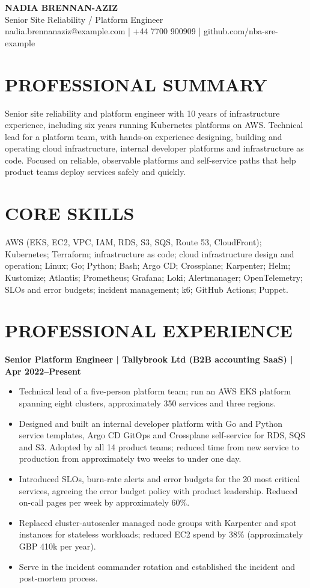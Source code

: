 \documentclass[11pt,a4paper]{article}
\begin{document}
\begin{center}
{\Huge\bfseries\color{primarycolor} NADIA BRENNAN-AZIZ}\\[0.3em]
{\large\color{accentcolor} Senior Site Reliability / Platform Engineer}\\[0.35em]
 nadia.brennanaziz@example.com | +44 7700 900909 | github.com/nba-sre-example
\end{center}

\section*{PROFESSIONAL SUMMARY}
Senior site reliability and platform engineer with 10 years of infrastructure experience, including six years running Kubernetes platforms on AWS. Technical lead for a platform team, with hands-on experience designing, building and operating cloud infrastructure, internal developer platforms and infrastructure as code. Focused on reliable, observable platforms and self-service paths that help product teams deploy services safely and quickly.

\section*{CORE SKILLS}
AWS (EKS, EC2, VPC, IAM, RDS, S3, SQS, Route 53, CloudFront); Kubernetes; Terraform; infrastructure as code; cloud infrastructure design and operation; Linux; Go; Python; Bash; Argo CD; Crossplane; Karpenter; Helm; Kustomize; Atlantis; Prometheus; Grafana; Loki; Alertmanager; OpenTelemetry; SLOs and error budgets; incident management; k6; GitHub Actions; Puppet.

\section*{PROFESSIONAL EXPERIENCE}
\noindent\textbf{Senior Platform Engineer | Tallybrook Ltd (B2B accounting SaaS) | Apr 2022--Present}
\begin{itemize}
\item Technical lead of a five-person platform team; run an AWS EKS platform spanning eight clusters, approximately 350 services and three regions.
\item Designed and built an internal developer platform with Go and Python service templates, Argo CD GitOps and Crossplane self-service for RDS, SQS and S3. Adopted by all 14 product teams; reduced time from new service to production from approximately two weeks to under one day.
\item Introduced SLOs, burn-rate alerts and error budgets for the 20 most critical services, agreeing the error budget policy with product leadership. Reduced on-call pages per week by approximately 60\%.
\item Replaced cluster-autoscaler managed node groups with Karpenter and spot instances for stateless workloads; reduced EC2 spend by 38\% (approximately GBP 410k per year).
\item Serve in the incident commander rotation and established the incident and post-mortem process.
\end{itemize}
\end{document}
